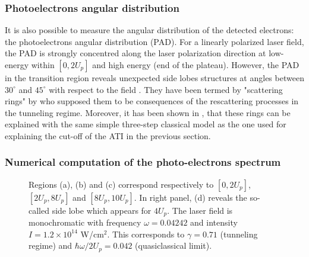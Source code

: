 \documentclass[a4paper]{article}
\begin{document}
\subsubsection{Photoelectrons angular distribution}

It is also possible to measure the angular distribution of the detected electrons: the photoelectrons angular distribution (PAD). For a linearly polarized laser field, the PAD is strongly concentred along the laser polarization direction at low-energy within $[0, 2U_{p}]$ and high energy (end of the plateau). However, the PAD in the transition region reveals unexpected side lobes structures at angles between $30^{\circ}$ and $45^{\circ}$ with respect to the field \cite{Paulus_1994_PAD, Yang_1993}. They have been termed by "scattering rings" by \cite{Yang_1993} who supposed them to be consequences of the rescattering processes in the tunneling regime. Moreover, it has been shown in \cite{Paulus_1994_Classical_Model}, that these rings can be explained with the same simple three-step classical model as the one used for explaining the cut-off of the ATI in the previous section.

\subsubsection{Numerical computation of the photo-electrons spectrum}
\label{computation_pes}

\begin{figure}[htp]
\begin{subfigure} [t]{0.5\textwidth}
 \resizebox{1\textwidth}{!}{}
\end{subfigure}
\begin{subfigure} [t]{0.5\textwidth}
\hspace{-1.5cm}
 \resizebox{1.6\textwidth}{!}{}
\end{subfigure}
 \caption{Regions (a), (b) and (c) correspond respectively to $[0, 2U_{p}]$, $[2U_{p}, 8U_{p}]$ and $[8U_{p}, 10U_{p}]$. In right panel, (d) reveals the so-called side lobe which appears for $4U_{p}$. The laser field is monochromatic with frequency $\omega=0.04242$ and intensity $I=1.2\times10^{14}$ W/cm$^{2}$. This corresponds to $\gamma=0.71$ (tunneling regime) and $\hbar\omega/2U_{p}=0.042$ (quasiclassical limit).}
\end{figure}
\end{document}
